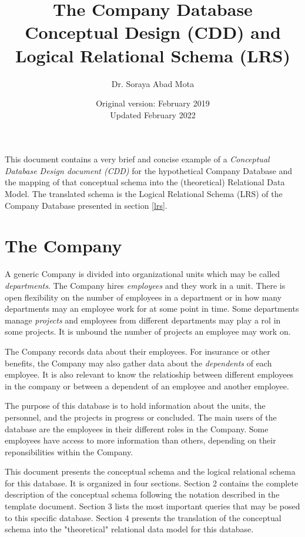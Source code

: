 \documentclass[11pt]{article}
\newlength{\lineheight}
\newcommand{\ls}[1]{\baselineskip=#1\lineheight}
\begin{document}
\title{The {\bf C}ompany {\bf D}atabase Conceptual {\bf D}esign (CDD)  and \\
Logical Relational Schema (LRS)}
\date{Original version: February 2019 \\
Updated February 2022}
\author{Dr. Soraya Abad Mota}

\maketitle

\begin{center}
This document contains a very brief and concise example of a {\em Conceptual Database Design document (CDD)} for the hypothetical Company Database and the mapping of that conceptual schema into the (theoretical) Relational Data Model. The translated schema is the Logical Relational Schema (LRS) of the Company Database presented in section \ref{lrs}.
\end{center}

\ls{1.2}
\section{The Company}
A generic Company is divided into organizational units which may be called {\em departments}.
The Company hires {\em employees} and they work in a unit. There is open flexibility on the number of employees in a department or in how many departments may an employee work for at some point in time. 
Some departments manage {\em projects} and employees from different departments may play a rol in some projects. It is unbound the number of projects an employee may work on.
 
The Company records data about their employees. For insurance or other benefits, the Company may also gather data about the {\em dependents} of each employee. It is also relevant to know the relatioship between different employees in the company or between a dependent of an employee and another employee.

The purpose of this database is to hold information about the units, the personnel, and the projects in progress or concluded. The main users of the database are the employees in their different roles in the Company. Some employees have access to more information than others, depending on their reponsibilities within the Company.

This document presents the conceptual schema and the logical relational schema for this database. It is organized in four sections. Section 2 contains the complete description of the conceptual schema following the notation described in the template document. Section 3 lists the most important queries that may be posed to this specific database. Section 4 presents the translation of the conceptual schema into the "theoretical" relational data model for this database.
\end{document}
